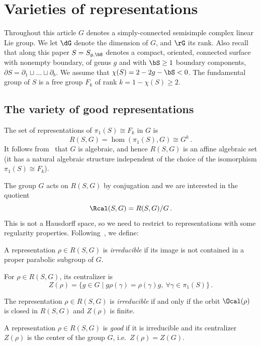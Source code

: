 \section{Varieties of representations}\label{Section:VR}

Throughout this article $G$ denotes a simply-connected semisimple complex linear Lie group. We let $\dG$ denote the dimension of $G$, and $\rG$ its rank. Also recall that along this paper $S=S_{g,\bS}$ denotes a compact, oriented, connected surface with nonempty boundary, of genus $g$ and with $\bS\geq 1$ boundary components, $\partial S = \partial_1 \sqcup\dots\sqcup\partial_b$. We assume that $\chi(S)=2-2g-\bS<0$. The fundamental group of $S$ is a free group $F_k$ of rank $k=1-\chi(S)\geq 2$.


\subsection{The variety of good representations}

The set of representations of $\pi_1(S)\cong F_k$ in $G$ is
\[
R(S,G)=\hom(\pi_1(S),G)\cong G^k\,.
\]
It follows from~\cite[Chapter~4, Section~1.2]{OV} that $G$ is algebraic, and hence $R(S,G)$ is an affine algebraic set (it has a natural algebraic structure independent of the choice of the isomorphism $\pi_1(S)\cong F_k$).

The group $G$ acts on $R(S,G)$ by conjugation and we are interested in the quotient
\[
\Rcal(S,G)=R(S,G)/G\,.
\]
This is not a Hausdorff space, so we need to restrict to representations with some regularity properties. Following~\cite{JohnsonMillson}, we define:

\begin{defi}
A representation $\rho\in R(S,G)$ is \emph{irreducible} if its image is not contained in a proper parabolic subgroup of $G$.
\end{defi}

For $\rho\in R(S,G)$, its centralizer is
\[
Z(\rho)=\{ g\in G \mid g\rho(\gamma)=\rho(\gamma)g,\ \forall\gamma\in\pi_1(S)\}\,.
\]


\begin{prop}
The representation $\rho\in R(S,G)$ is \emph{irreducible} if and only if the orbit $\Ocal(\rho)$ is closed in $R(S,G)$ and $Z(\rho)$ is finite.
\end{prop}



\begin{defi}\label{Definition:good}
A representation $\rho\in R(S,G)$ is
\emph{good} if it is irreducible and its centralizer $Z(\rho)$ is the center of the group $G$, i.e.~$Z(\rho)=Z(G)$.
\end{defi}

